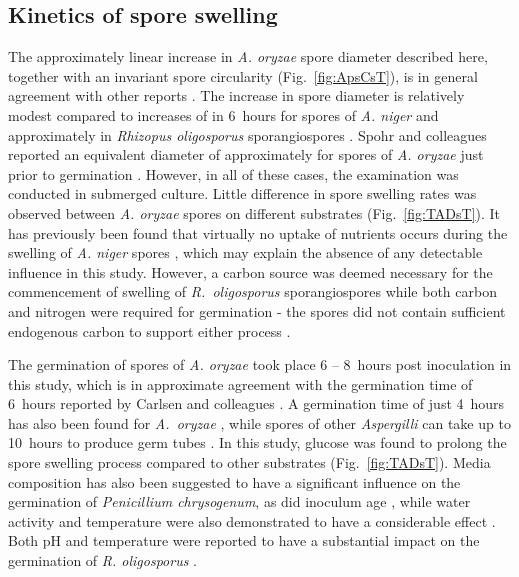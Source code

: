 \subsection{Kinetics of spore swelling}

The approximately linear increase in \emph{A. oryzae} spore diameter described here, together with an invariant spore circularity (Fig.~\ref{fig:ApsCsT}), is in general agreement with other reports \cite{spohr1998}. The increase in spore diameter is relatively modest compared to increases of  in 6~hours for spores of \emph{A. niger} \cite{bizukojc2006} and approximately  in \emph{Rhizopus oligosporus} sporangiospores \cite{medwid1984}. Spohr and colleagues reported an equivalent diameter of approximately  for spores of \emph{A. oryzae} just prior to germination \cite{spohr1998}. However, in all of these cases, the examination was conducted in submerged culture. Little difference in spore swelling rates was observed between \emph{A. oryzae} spores on different substrates (Fig.~\ref{fig:TADsT}). It has previously been found that virtually no uptake of nutrients occurs during the swelling of \emph{A. niger} spores \cite{bizukojc2006}, which may explain the absence of any detectable influence in this study. However, a carbon source was deemed necessary for the commencement of swelling of \emph{R.~oligosporus} sporangiospores while both carbon and nitrogen were required for germination - the spores did not contain sufficient endogenous carbon to support either process \cite{medwid1984}.

The germination of spores of \emph{A. oryzae} took place 6 -- 8~hours post inoculation in this study, which is in approximate agreement with the germination time of 6~hours reported by Carlsen and colleagues \cite{carlsen1996a}. A germination time of just 4~hours has also been found for \emph{A.~oryzae} \cite{spohr1998}, while spores of other \emph{Aspergilli} can take up to 10~hours to produce germ tubes \cite{bizukojc2006}. In this study, glucose was found to prolong the spore swelling process compared to other substrates (Fig.~\ref{fig:TADsT}). Media composition has also been suggested to have a significant influence on the germination of \emph{Penicillium chrysogenum}, as did inoculum age \cite{paul1993}, while water activity and temperature were also demonstrated to have a considerable effect \cite{sautour2001}. Both pH and temperature were reported to have a substantial impact on the germination of \emph{R. oligosporus} \cite{medwid1984}.

